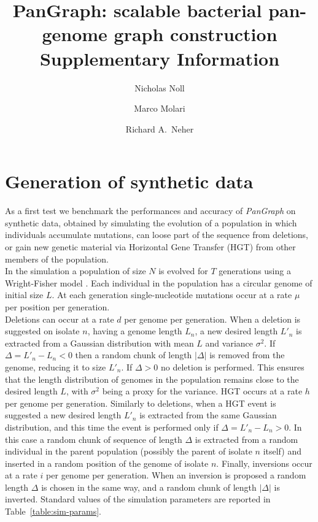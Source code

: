 \documentclass[aps,rmp,reprint,superscriptaddress,notitlepage,10pt,onecolumn]{revtex4-1}
\begin{document}
\title{PanGraph: scalable bacterial pan-genome graph construction \\ Supplementary Information}
\author{Nicholas Noll}
\author{Marco Molari}
\author{Richard A.~Neher}

\maketitle

\section{Generation of synthetic data}
\label{supp:data_generation}

As a first test we benchmark the performances and accuracy of \textit{PanGraph} on synthetic data, obtained by simulating the evolution of a population in which individuals accumulate mutations, can loose part of the sequence from deletions, or gain new genetic material via Horizontal Gene Transfer (HGT) from other members of the population.\\
In the simulation a population of size $N$ is evolved for $T$ generations using a Wright-Fisher model \cite{hudson2002generating}. Each individual in the population has a circular genome of initial size $L$. At each generation single-nucleotide mutations occur at a rate $\mu$ per position per generation.\\
Deletions can occur at a rate $d$ per genome per generation. When a deletion is suggested on isolate $n$, having a genome length $L_n$, a new desired length $L'_n$ is extracted from a Gaussian distribution with mean $L$ and variance $\sigma^2$. If $\Delta = L'_n - L_n < 0$ then a random chunk of length $|\Delta|$ is removed from the genome, reducing it to size $L'_n$. If $\Delta > 0$ no deletion is performed. This ensures that the length distribution of genomes in the population remains close to the desired length $L$, with $\sigma^2$ being a proxy for the variance.
HGT occurs at a rate $h$ per genome per generation. Similarly to deletions, when a HGT event is suggested a new desired length $L'_n$ is extracted from the same Gaussian distribution, and this time the event is performed only if $\Delta = L'_n - L_n > 0$. In this case a random chunk of sequence of length $\Delta$ is extracted from a random individual in the parent population (possibly the parent of isolate $n$ itself) and inserted in a random position of the genome of isolate $n$.
Finally, inversions occur at a rate $i$ per genome per generation. When an inversion is proposed a random length $\Delta$ is chosen in the same way, and a random chunk of length $|\Delta|$ is inverted.
Standard values of the simulation parameters are reported in Table~\ref{table:sim-params}.
\end{document}
